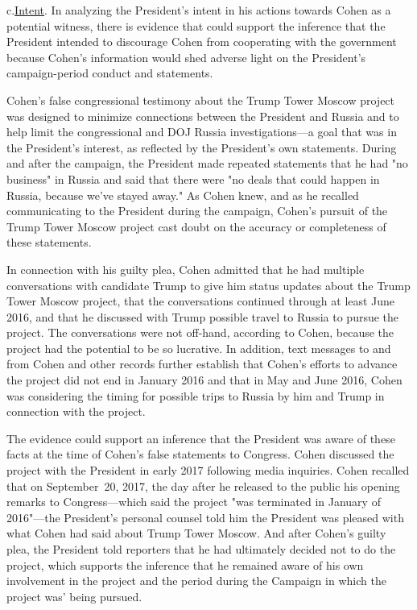 c.\qquad\underline{Intent}.
In analyzing the President's intent in his actions towards Cohen as a potential witness, there is evidence that could support the inference that the President intended to discourage Cohen from cooperating with the government because Cohen's information would shed adverse light on the President's campaign-period conduct and statements.

Cohen's false congressional testimony about the Trump Tower Moscow project was designed to minimize connections between the President and Russia and to help limit the congressional and DOJ Russia investigations---a goal that was in the President's interest, as reflected by the President's own statements.
During and after the campaign, the President made repeated statements that he had "no business" in Russia and said that there were "no deals that could happen in Russia, because we've stayed away."
As Cohen knew, and as he recalled communicating to the President during the campaign, Cohen's pursuit of the Trump Tower Moscow project cast doubt on the accuracy or completeness of these statements.

In connection with his guilty plea, Cohen admitted that he had multiple conversations with candidate Trump to give him status updates about the Trump Tower Moscow project, that the conversations continued through at least June 2016, and that he discussed with Trump possible travel to Russia to pursue the project.
The conversations were not off-hand, according to Cohen, because the project had the potential to be so lucrative.
In addition, text messages to and from Cohen and other records further establish that Cohen's efforts to advance the project did not end in January 2016 and that in May and June 2016, Cohen was considering the timing for possible trips to Russia by him and Trump in connection with the project.

The evidence could support an inference that the President was aware of these facts at the time of Cohen's false statements to Congress.
Cohen discussed the project with the President in early 2017 following media inquiries.
Cohen recalled that on September~20, 2017, the day after he released to the public his opening remarks to Congress---which said the project "was terminated in January of 2016"---the President's personal counsel told him the President was pleased with what Cohen had said about Trump Tower Moscow.
And after Cohen's guilty plea, the President told reporters that he had ultimately decided not to do the project, which supports the inference that he remained aware of his own involvement in the project and the period during the Campaign in which the project was' being pursued.


